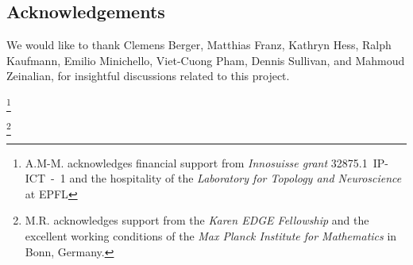 
\subsection*{Acknowledgements}

We would like to thank Clemens Berger, Matthias Franz, Kathryn Hess, Ralph Kaufmann, Emilio Minichello, Viet-Cuong Pham, Dennis Sullivan, and Mahmoud Zeinalian, for insightful discussions related to this project.

\thanks{A.M-M. acknowledges financial support from \textit{Innosuisse grant} \mbox{32875.1 IP-ICT - 1} and the hospitality of the \textit{Laboratory for Topology and Neuroscience} at EPFL}

\thanks{M.R. acknowledges support from the \textit{Karen EDGE Fellowship} and the excellent working conditions of the \textit{Max Planck Institute for Mathematics} in Bonn, Germany.}